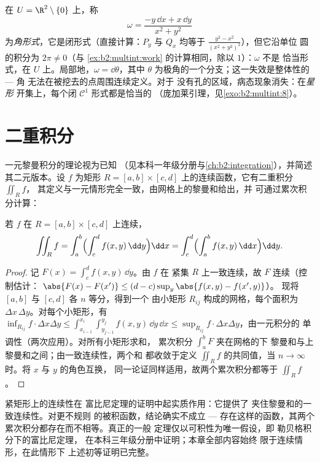 \begin{example}[闭形式未必恰当]\label{ex:b2:multint:angleform}
在 $U = \R^2 \setminus \{0\}$ 上，称
\[
\omega = \frac{-y\,\dd x + x\,\dd y}{x^2 + y^2}
\]
为\emph{角形式}，它是闭形式（直接计算：$P_y$ 与 $Q_x$ 均等于
$\frac{y^2 - x^2}{(x^2+y^2)^2}$），但它沿单位
圆的积分为 $2\pi \neq 0$（与
\cref{ex:b2:multint:work} 的计算相同，除以 $1$）：$\omega$ 不是
恰当形式，在 $U$ 上。局部地，$\omega = \dd\theta$，其中
$\theta$ 为极角的一个分支；这一失效是整体性的 --- 角
无法在被挖去的点周围连续定义。对于
没有孔的区域，病态现象消失：在\emph{星形}
开集上，每个闭 $\mathcal{C}^1$ 形式都是恰当的
（庞加莱引理，见\cref{exo:b2:multint:8}）。
\end{example}

\section{二重积分}

一元黎曼积分的理论视为已知
（见本科一年级分册与\cref{ch:b2:integration}），并简述
其二元版本。设 $f$ 为矩形
$R = [a, b] \times [c, d]$ 上的连续函数，它有二重积分 $\iint_R f$，
其定义与一元情形完全一致，由网格上的黎曼和给出，并
可通过累次积分计算：

\begin{theorem}[矩形上的富比尼定理]\label{thm:b2:multint:fubini}
若 $f$ 在 $R = [a,b] \times [c,d]$ 上连续，
\[
\iint_R f
= \int_a^b \Bigl(\int_c^d f(x, y)\,\dd y\Bigr)\dd x
= \int_c^d \Bigl(\int_a^b f(x, y)\,\dd x\Bigr)\dd y .
\]
\end{theorem}

\begin{proof}
记 $F(x) = \int_c^d f(x, y)\,\dd y$。由 $f$ 在
紧集 $R$ 上一致连续，故 $F$ 连续（控制估计：
$\abs{F(x) - F(x')} \leq (d - c)\sup_y\abs{f(x,y) - f(x',y)}$）。
现将 $[a,b]$ 与 $[c,d]$ 各 $n$ 等分，得到一个
由小矩形 $R_{ij}$ 构成的网格，每个面积为 $\Delta x\,\Delta y$。对每个小矩形，有
$\inf_{R_{ij}} f \cdot \Delta x \Delta y \leq
\int_{x_{i-1}}^{x_i}\int_{y_{j-1}}^{y_j} f(x,y)\,\dd y\,\dd x \leq
\sup_{R_{ij}} f \cdot \Delta x \Delta y$，由一元积分的
单调性（两次应用）。对所有小矩形求和，
累次积分 $\int_a^b F$ 夹在网格的下
黎曼和与上黎曼和之间；由一致连续性，两个和
都收敛于定义 $\iint_R f$ 的共同值，当 $n \to
\infty$ 时。将 $x$ 与 $y$ 的角色互换，
同一论证同样适用，故两个累次积分都等于 $\iint_R f$。
\end{proof}

\begin{remark}
紧矩形上的连续性在
富比尼定理的证明中起实质作用：它提供了
夹住黎曼和的一致连续性。对更不规则
的被积函数，结论确实不成立 --- 存在这样的函数，其两个
累次积分都存在而不相等。真正的一般
定理仅以可积性为唯一假设，即
勒贝格积分下的富比尼定理，
在本科三年级分册中证明；本章全部内容始终
限于连续情形，在此情形下
上述初等证明已完整。
\end{remark}

